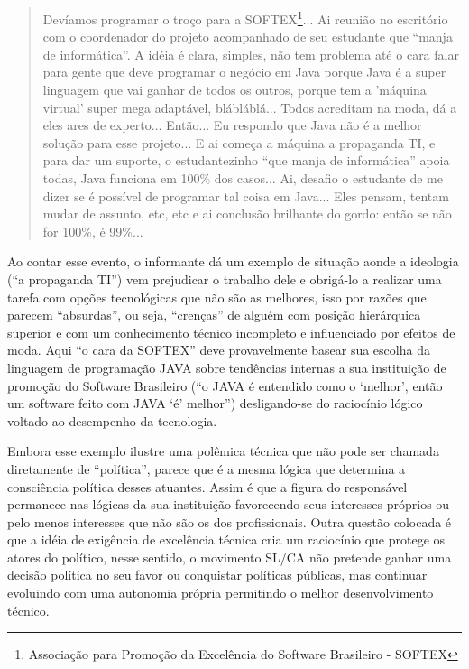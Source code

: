 \begin{quote}
Devíamos programar o troço para a SOFTEX\footnote{Associação para Promoção da Excelência do Software Brasileiro - SOFTEX}... Ai reunião no escritório com o coordenador do projeto acompanhado de seu estudante que “manja de informática”. A idéia é clara, simples, não tem problema até o cara falar para gente que deve programar o negócio em Java porque Java é a super linguagem que vai ganhar de todos os outros, porque tem a 'máquina virtual' super mega adaptável, blábláblá... Todos acreditam na moda, dá a eles ares de experto... Então... Eu respondo que Java não é a melhor solução para esse projeto... E ai começa a máquina a propaganda TI, e para dar um suporte, o estudantezinho “que manja de informática” apoia todas, Java funciona em 100\% dos casos... Ai, desafio o estudante de me dizer se é possível de programar tal coisa em Java... Eles pensam, tentam mudar de assunto, etc, etc e ai conclusão brilhante do gordo: então se não for 100\%, é 99\%...
\end{quote}

Ao contar esse evento, o informante dá um exemplo de situação aonde a ideologia (“a propaganda TI”) vem prejudicar o trabalho dele e obrigá-lo a realizar uma tarefa com opções tecnológicas que não são as melhores, isso por razões que parecem “absurdas”, ou seja, “crenças” de alguém com posição hierárquica superior e com um conhecimento técnico incompleto e influenciado por efeitos de moda. Aqui “o cara da SOFTEX” deve provavelmente basear sua escolha da linguagem de programação JAVA sobre tendências internas a sua instituição de promoção do Software Brasileiro (“o JAVA é entendido como o ‘melhor’, então um software feito com JAVA ‘é’ melhor”) desligando-se do raciocínio lógico voltado ao desempenho da tecnologia.

Embora esse exemplo ilustre uma polêmica técnica que não pode ser chamada diretamente de “política”, parece que é a mesma lógica que determina a consciência política desses atuantes. Assim é que a figura do responsável permanece nas lógicas da sua instituição favorecendo seus interesses próprios ou pelo menos interesses que não são os dos profissionais. Outra questão colocada é que a idéia de exigência de excelência técnica cria um raciocínio que protege os atores do político, nesse sentido, o movimento SL/CA não pretende ganhar uma decisão política no seu favor ou conquistar políticas públicas, mas continuar evoluindo com uma autonomia própria permitindo o melhor desenvolvimento técnico.

